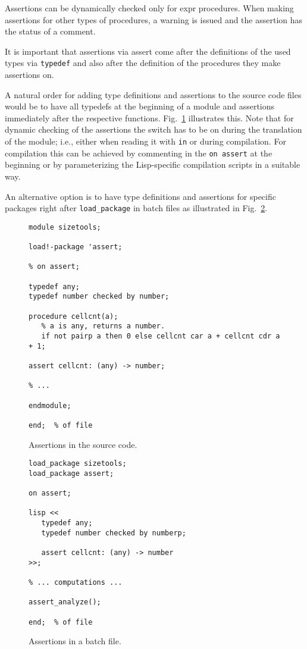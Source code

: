 Assertions can be dynamically checked only for expr procedures. When
making assertions for other types of procedures, a warning is issued and
the assertion has the status of a comment.

It is important that assertions via assert come after the definitions of
the used types via \texttt{typedef} and also after the definition of the
procedures they make assertions on.

A natural order for adding type definitions and assertions to the source
code files would be to have all typedefs at the beginning of a module
and assertions immediately after the respective functions.
Fig.~\ref{FIG:assMod} illustrates this. Note that for dynamic checking
of the assertions the switch  has to be on during
the translation of the module; i.e., either when reading it with
\texttt{in} or during compilation. For compilation this can be achieved
by commenting in the \texttt{on assert} at the beginning or by
parameterizing the Lisp-specific compilation scripts in a suitable way.

An alternative option is to have type definitions and assertions for
specific packages right after \texttt{load\_package} in batch files as
illustrated in Fig.~\ref{FIG:assBat}.
\begin{figure}
  \begin{small}
\begin{verbatim}
module sizetools;

load!-package 'assert;

% on assert;

typedef any;
typedef number checked by number;

procedure cellcnt(a);
   % a is any, returns a number.
   if not pairp a then 0 else cellcnt car a + cellcnt cdr a + 1;

assert cellcnt: (any) -> number;

% ...

endmodule;

end;  % of file
\end{verbatim}
  \end{small}
  \caption{Assertions in the source code.}\label{FIG:assMod}
\end{figure}

\begin{figure}
  \begin{small}
\begin{verbatim}
load_package sizetools;
load_package assert;

on assert;

lisp <<
   typedef any;
   typedef number checked by numberp;

   assert cellcnt: (any) -> number
>>;

% ... computations ...

assert_analyze();

end;  % of file
\end{verbatim}
  \end{small}
  \caption{Assertions in a batch file.}\label{FIG:assBat}
\end{figure}

